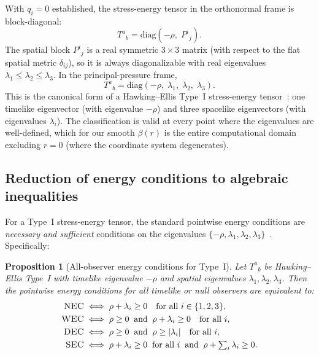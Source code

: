 \documentclass[11pt]{article}
\makeatletter
\newtheorem{proposition}{Proposition}
\newcommand{\@abbr}[1]{\ifmmode\mathrm{#1}\else\textsc{#1}\fi}
\newcommand{\WEC}{\@abbr{WEC}}
\newcommand{\NEC}{\@abbr{NEC}}
\newcommand{\SEC}{\@abbr{SEC}}
\newcommand{\DEC}{\@abbr{DEC}}
\makeatother
\begin{document}
With $q_i = 0$ established, the stress-energy tensor in the orthonormal frame is block-diagonal:
\begin{equation}
\label{eq:Tab-block}
T^a{}_b = \mathrm{diag}(-\rho,\; P^i{}_j).
\end{equation}
The spatial block $P^i{}_j$ is a real symmetric $3\times 3$ matrix (with respect to the flat spatial metric $\delta_{ij}$), so it is always diagonalizable with real eigenvalues $\lambda_1 \le \lambda_2 \le \lambda_3$. In the principal-pressure frame,
\begin{equation}
T^a{}_b = \mathrm{diag}(-\rho,\;\lambda_1,\;\lambda_2,\;\lambda_3).
\end{equation}
This is the canonical form of a Hawking--Ellis Type~I stress-energy tensor~\cite{HawkingEllis1973,Maeda:2022vld}: one timelike eigenvector (with eigenvalue $-\rho$) and three spacelike eigenvectors (with eigenvalues $\lambda_i$). The classification is valid at every point where the eigenvalues are well-defined, which for our smooth $\beta(r)$ is the entire computational domain excluding $r=0$ (where the coordinate system degenerates).

\subsection{Reduction of energy conditions to algebraic inequalities}

For a Type~I stress-energy tensor, the standard pointwise energy conditions are \emph{necessary and sufficient} conditions on the eigenvalues $\{-\rho, \lambda_1, \lambda_2, \lambda_3\}$~\cite{HawkingEllis1973,MartinMoruno:2017exc}. Specifically:

\begin{proposition}[All-observer energy conditions for Type~I]
\label{prop:type1-ec}
Let $T^a{}_b$ be Hawking--Ellis Type~I with timelike eigenvalue $-\rho$ and spatial eigenvalues $\lambda_1,\lambda_2,\lambda_3$. Then the pointwise energy conditions for \emph{all} timelike or null observers are equivalent to:
\begin{align}
\NEC &\iff \rho + \lambda_i \ge 0 \quad \text{for all } i \in \{1,2,3\}, \label{eq:nec-type1}\\
\WEC &\iff \rho \ge 0 \;\;\text{and}\;\; \rho + \lambda_i \ge 0 \quad \text{for all } i, \label{eq:wec-type1}\\
\DEC &\iff \rho \ge 0 \;\;\text{and}\;\; \rho \ge |\lambda_i| \quad \text{for all } i, \label{eq:dec-type1}\\
\SEC &\iff \rho + \lambda_i \ge 0 \;\;\text{for all } i \;\;\text{and}\;\; \rho + \textstyle\sum_i \lambda_i \ge 0. \label{eq:sec-type1}
\end{align}
\end{proposition}
\end{document}
